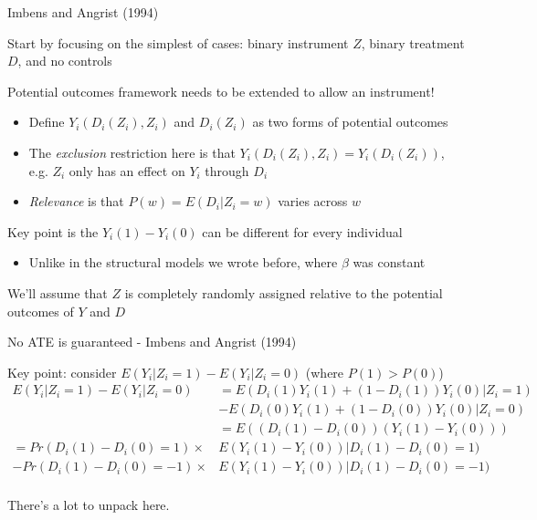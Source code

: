 \documentclass[notes,11pt, aspectratio=169]{beamer}
\newenvironment{wideitemize}{\itemize\addtolength{\itemsep}{10pt}}{\enditemize}
\begin{document}
\begin{frame}{Imbens and Angrist  (1994)}
  \begin{wideitemize}
  \item Start by focusing on the simplest of cases: binary instrument
    $Z$, binary treatment $D$, and no controls
  \item Potential outcomes framework needs to be extended to allow an instrument!
    \begin{itemize}
    \item Define $Y_{i}(D_{i}(Z_{i}), Z_{i})$ and $D_{i}(Z_{i})$ as two forms of potential outcomes
    \item The \emph{exclusion} restriction here is that
      $Y_{i}(D_{i}(Z_{i}), Z_{i}) =Y_{i}(D_{i}(Z_{i}))$, e.g. $Z_{i}$
      only has an effect on $Y_{i}$ through $D_{i}$
    \item \emph{Relevance} is that $P(w) = E(D_{i} | Z_{i} = w)$ varies across $w$
    \end{itemize}
  \item  Key point is the $Y_{i}(1) - Y_{i}(0)$ can be different for every individual
    \begin{itemize}
    \item Unlike in the structural models we wrote before, where $\beta$ was constant
    \end{itemize}
  \item We'll assume that $Z$ is completely randomly assigned relative
    to the potential outcomes of $Y$ and $D$
  \end{wideitemize}
\end{frame}

\begin{frame}{No ATE is guaranteed  - Imbens and Angrist  (1994)}
  \begin{wideitemize}
  \item Key point: consider $E(Y_{i} | Z_{i} = 1) - E(Y_{i} | Z_{i} = 0)$ (where $P(1) > P(0)$)
    \begin{align*}
      E(Y_{i} | Z_{i} = 1) - E(Y_{i} | Z_{i} = 0) &= E(D_{i}(1)Y_{i}(1) + (1-D_{i}(1))Y_{i}(0)  | Z_{i} = 1)\\
                                                  &- E(D_{i}(0)Y_{i}(1) + (1-D_{i}(0))Y_{i}(0)  | Z_{i} = 0)\\
                                                  &= E((D_{i}(1) - D_{i}(0))(Y_{i}(1) - Y_{i}(0)))\\
      = Pr(D_{i}(1) - D_{i}(0) = 1) \times &E(Y_{i}(1) - Y_{i}(0)) | D_{i}(1) - D_{i}(0) = 1) \\
      - Pr(D_{i}(1) - D_{i}(0) = -1) \times &E(Y_{i}(1) - Y_{i}(0)) | D_{i}(1) - D_{i}(0) = -1) \\
    \end{align*}
  \item There's a lot to unpack here.
  \end{wideitemize}
\end{frame}
\end{document}
